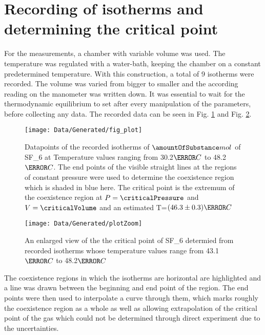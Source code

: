\documentclass[a4paper,10pt,twocolumn]{article}
\begin{document}
    \section{Recording of isotherms and determining the critical point} \label{sec:Measurement}
    For the measurements, a chamber with variable volume was used.
    The temperature was regulated with a water-bath, keeping the chamber on a constant predetermined temperature.
    With this construction, a total of 9 isotherms were recorded. %
    The volume was varied from bigger to smaller and the according reading on the manometer was written down.
    It was essential to wait for the thermodynamic equilibrium to set after every manipulation of the parameters, before collecting any data.
    The recorded data can be seen in Fig. \ref{fig:binodal} and Fig.  \ref{fig:binodalZoom}.
    \begin{figure}
        \begin{center}
            \texttt{[image: Data/Generated/fig\_plot]}\label{fig:binodal}
            \caption[]{Datapoints of the recorded isotherms of $\amountOfSubstance mol$ of SF_6\) at Temperature values ranging from 30.2$\degree C$ to 48.2$\degree C$. The end points of the visible straight lines at the regions of constant pressure were
            used to determine the coexistence region which is shaded in blue here. The critical point is the extremum of the coexistence region at $P=\criticalPressure$ and $V=\criticalVolume$ and an estimated
            T=$(46.3\pm0.3)\degree C$}
        \end{center}
    \end{figure}
    \begin{figure}
        \begin{center}
            \texttt{[image: Data/Generated/plotZoom]}\label{fig:binodalZoom}
            \caption[]{An enlarged view of the the critical point of SF_6\) determied from recorded isotherms whose temperature values range from 43.1$\degree C$ to 48.2$\degree C$}
        \end{center}
        \end{figure}
    The coexistence regions in which the isotherms are horizontal are highlighted and a line was drawn between the beginning and end point of the region.
    The end points were then used to interpolate a curve through them, which marks roughly the coexistence region as a whole as well as allowing extrapolation of the critical point of the gas which could not be
    determined through direct experiment due to the uncertainties.
\end{document}
